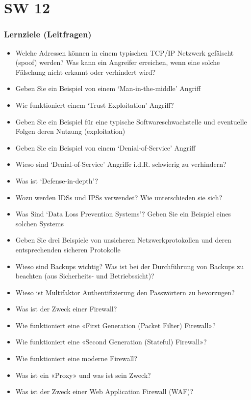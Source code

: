 \part{SW 12}
\section{Lernziele (Leitfragen)}
\begin{itemize}
    \item Welche Adressen können in einem typischen TCP/IP Netzwerk gefälscht (spoof) werden? Was kann ein Angreifer erreichen, wenn eine solche Fälschung nicht erkannt oder verhindert wird?
    \item Geben Sie ein Beispiel von einem ‘Man-in-the-middle’ Angriff
    \item Wie funktioniert einem ‘Trust Exploitation’ Angriff?
    \item Geben Sie ein Beispiel für eine typische Softwareschwachstelle und eventuelle Folgen deren Nutzung (exploitation)
    \item Geben Sie ein Beispiel von einem ‘Denial-of-Service’ Angriff
    \item Wieso sind ‘Denial-of-Service’ Angriffe i.d.R. schwierig zu verhindern?
    \item Was ist ‘Defense-in-depth’?
    \item Wozu werden IDSs und IPSs verwendet? Wie unterschieden sie sich?
    \item Was Sind ‘Data Loss Prevention Systems’? Geben Sie ein Beispiel eines solchen Systems
    \item Geben Sie drei Beispiele von unsicheren Netzwerkprotokollen und deren entsprechenden sicheren Protokolle
    \item Wieso sind Backups wichtig? Was ist bei der Durchführung von Backups zu beachten (aus Sicherheits- und Betriebssicht)?
    \item Wieso ist Multifaktor Authentifizierung den Passwörtern zu bevorzugen?
    \item Was ist der Zweck einer Firewall?
    \item Wie funktioniert eine «First Generation (Packet Filter) Firewall»?
    \item Wie funktioniert eine «Second Generation (Stateful) Firewall»?
    \item Wie funktioniert eine moderne Firewall?
    \item Was ist ein «Proxy» und was ist sein Zweck?
    \item Was ist der Zweck einer Web Application Firewall (WAF)?

\end{itemize}
